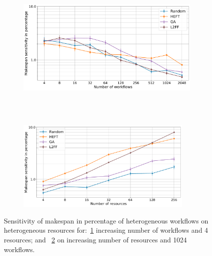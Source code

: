 \begin{figure}[ht!]
    \centering
    \begin{subfigure}[b]{0.85\textwidth}
        \includegraphics[width=.95\textwidth]{figures/campaign/StHeteroCampaigns_4DynHeteroResourcesSens.pdf}
        \caption{}
        \label{fig:StHeteroCampaigns_4DyHeteroResourcesSens}
    \end{subfigure}\\
    ~
    \begin{subfigure}[b]{0.85\textwidth}
        \includegraphics[width=0.95\textwidth]{figures/campaign/DynHeteroResources_StHeteroCampaignsSens.pdf}
        \caption{}
        \label{fig:DyHeteroResources_StHeteroCampaignsSens}
    \end{subfigure}
    \caption{Sensitivity of makespan in percentage of heterogeneous workflows on heterogeneous resources for:~\ref{fig:StHeteroCampaigns_4DyHeteroResourcesSens}  increasing number of workflows and 4 resources; and
    ~\ref{fig:DyHeteroResources_StHeteroCampaignsSens} on increasing number of resources and 1024 workflows.}
    \label{fig:dyn_hetero_sens_analysis}
\end{figure}

